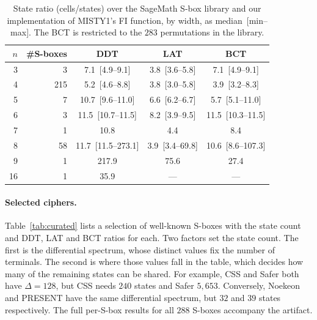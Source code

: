 \documentclass[runningheads]{llncs}
\begin{document}
\begin{table}[h]
\centering
\caption{State ratio (cells/states) over the SageMath S-box
library and our implementation of MISTY1's FI function, by width, as median~[min--max]. The BCT is restricted to the $283$
permutations in the library.}
\setlength{\tabcolsep}{3pt}
\label{tab:agg}
\begin{tabular}{r r c c c}
\toprule
$n$ & \#S-boxes & DDT & LAT & BCT\\
\midrule
3 & 3   & 7.1~[4.9--9.1]    & 3.8~[3.6--5.8]   & 7.1~[4.9--9.1]\\
4 & 215 & 5.2~[4.6--8.8]    & 3.8~[3.0--5.8]   & 3.9~[3.2--8.3]\\
5 & 7   & 10.7~[9.6--11.0]  & 6.6~[6.2--6.7]   & 5.7~[5.1--11.0]\\
6 & 3   & 11.5~[10.7--11.5] & 8.2~[3.9--9.5]   & 11.5~[10.3--11.5]\\
7 & 1   & 10.8              & 4.4              & 8.4\\
8 & 58  & 11.7~[11.5--273.1]& 3.9~[3.4--69.8]  & 10.6~[8.6--107.3]\\
9 & 1   & 217.9             & 75.6             & 27.4\\
16 & 1   &  35.9          & ---             & ---\\
\bottomrule
\end{tabular}
\end{table}

\paragraph{Selected ciphers.}
Table~\ref{tab:curated} lists a selection of well-known S-boxes with the state count and DDT, LAT and BCT ratios for each. Two factors set the state count. The first is the differential spectrum, whose distinct values fix the number of terminals. The second is where those values fall in the table, which decides how many of the remaining states can be shared. For example, CSS and Safer both have $\Delta=128$, but CSS needs $240$ states and Safer $5{,}653$. Conversely, Noekeon and PRESENT have the same differential spectrum, but $32$ and $39$ states respectively. The full per-S-box results
for all $288$ S-boxes accompany the artifact.
\end{document}
